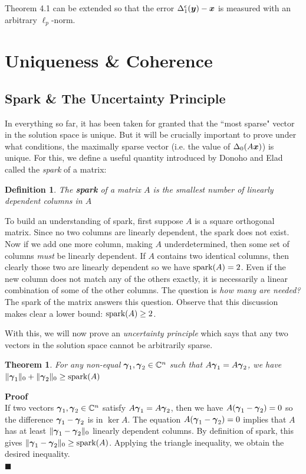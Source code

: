 \documentclass[twocolumn]{gwclass}
\newtheorem{theorem}{Theorem}[section]
\newtheorem{definition}{Definition}
\renewcommand\qedsymbol{$\blacksquare$}
\newcommand{\C}{\mathbb{C}}
\begin{document}
	Theorem 4.1 can be extended so that the error $\Delta_1^\epsilon(\boldsymbol{y})-\boldsymbol{x}$ is measured with an arbitrary $\ell_p$-norm.

\newpage
	
	\section{Uniqueness \& Coherence}
	\subsection{Spark \& The Uncertainty Principle}
	In everything so far, it has been taken for granted that the ``most sparse" vector in the solution space is unique. But it will be crucially important to prove under what conditions, the maximally sparse vector (i.e. the value of $\Delta_0(A\boldsymbol{x})$) is unique. For this, we define a useful quantity introduced by Donoho and Elad called the \emph{spark} of a matrix: 
	\begin{definition}
		The \textbf{spark} of a matrix $A$ is the smallest number of linearly dependent columns in $A$
	\end{definition}
	To build an understanding of spark, first suppose $A$ is a square orthogonal matrix. Since no two columns are linearly dependent, the spark does not exist. Now if we add one more column, making $A$ underdetermined, then some set of columns \emph{must} be linearly dependent. If $A$ contains two identical columns, then clearly those two are linearly dependent so we have $\text{\normalfont{spark}}(A)=2$. Even if the new column does not match any of the others exactly, it is necessarily a linear combination of some of the other columns. The question is \emph{how many are needed?} The spark of the matrix answers this question. Observe that this discussion makes clear a lower bound: $ \text{\normalfont{spark}}(A) \geq 2 $.
	
	With this, we will now prove an \emph{uncertainty principle} which says that any two vectors in the solution space cannot be arbitrarily sparse. 
	
	\begin{theorem}
		For any non-equal $\*\gamma_1,\*\gamma_2\in\C^n$ such that $A\boldsymbol{\gamma}_1=A\boldsymbol{\gamma}_2$, we have $ \|\boldsymbol{\gamma}_1\|_0 + \|\boldsymbol{\gamma}_2\|_0 \geq\text{\normalfont{spark}}(A) $
	\end{theorem}
	\noindent \textbf{Proof}\\
	If two vectors $\*\gamma_1,\*\gamma_2\in\C^n$ satisfy $A\boldsymbol{\gamma}_1=A\boldsymbol{\gamma}_2$, then we have $A(\boldsymbol{\gamma}_1 - \boldsymbol{\gamma}_2)=0$ so the difference $\boldsymbol{\gamma}_1-\boldsymbol{\gamma}_2$ is in $\ker A$. The equation $A(\boldsymbol{\gamma}_1-\boldsymbol{\gamma}_2)=0$ implies that $A$ has at least $\|\boldsymbol{\gamma}_1 - \boldsymbol{\gamma}_2\|_0$ linearly dependent columns. By definition of spark, this gives $\|\boldsymbol{\gamma}_1 - \boldsymbol{\gamma}_2\|_0 \geq \text{\normalfont{spark}}(A)$. Applying the triangle inequality, we obtain the desired inequality.\\
	\qedsymbol
	
\end{document}
